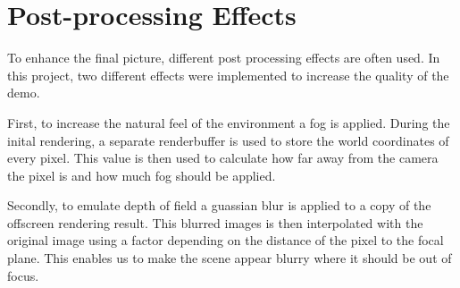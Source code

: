 \section{Post-processing Effects}
\label{cha:effects}

To enhance the final picture, different post processing effects are often used.
In this project, two different effects were implemented to increase the quality of the demo.

First, to increase the natural feel of the environment a fog is applied.
During the inital rendering, a separate renderbuffer is used to store the
world coordinates of every pixel. This value is then used to calculate how
far away from the camera the pixel is and how much fog should be applied.

Secondly, to emulate depth of field a guassian blur is applied to a copy
of the offscreen rendering result. This blurred images is then interpolated
with the original image using a factor depending on the distance of the pixel
to the focal plane.
This enables us to make the scene appear blurry where it should be out of focus.
